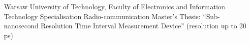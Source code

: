 %
%
%




\begin{scholarship}
					{Warsaw University of Technology, Faculty of Electronics and Information Technology \newline
					Specialisation Radio-communication \newline
					Master’s Thesis: “Sub-nanosecond Resolution Time Interval Measurement Device” (resolution up to 20 ps)}
\end{scholarship}
